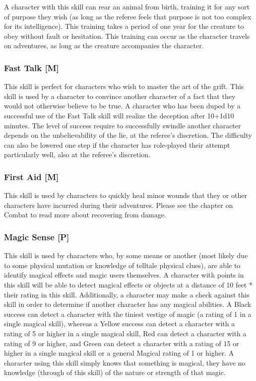 \documentclass[oneside]{book}
\begin{document}
\begin{multicols}{2}
A character with this skill can rear an animal from birth, training it for any sort of purpose they wish (as long as the referee feels that purpose is not too complex for its intelligence). This training takes a period of one year for the creature to obey without fault or hesitation. This training can occur as the character travels on adventures, as long as the creature accompanies the character. 

\subsubsection{Fast Talk [M]}
This skill is perfect for characters who wish to master the art of the grift. This skill is used by a character to convince another character of a fact that they would not otherwise believe to be true. A character who has been duped by a successful use of the Fast Talk skill will realize the deception after 10+1d10 minutes. The level of success require to successfully swindle another character depends on the unbelievability of the lie, at the referee's discretion. The difficulty can also be lowered one step if the character has role-played their attempt particularly well, also at the referee's discretion. 

\subsubsection{First Aid [M]}
This skill is used by characters to quickly heal minor wounds that they or other characters have incurred during their adventures. Please see the chapter on Combat to read more about recovering from damage.

\subsubsection{Magic Sense [P]}
This skill is used by characters who, by some means or another (most likely due to some physical mutation or knowledge of telltale physical clues), are able to identify magical effects and magic users themselves. A character with points in this skill will be able to detect magical effects or objects at a distance of 10 feet * their rating in this skill. Additionally, a character may make a check against this skill in order to determine if another character has any magical abilities. A Black success can detect a character with the tiniest vestige of magic (a rating of 1 in a single magical skill), whereas a Yellow success can detect a character with a rating of 5 or higher in a single magical skill, Red can detect a character with a rating of 9 or higher, and Green  can detect a character with a rating of 15 or higher in a single magical skill or a general Magical rating of 1 or higher. A character using this skill simply knows that something is magical, they have no knowledge (through of this skill) of the nature or strength of that magic. 


\end{multicols}
\end{document}
